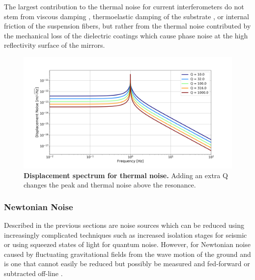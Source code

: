 		The largest contribution to the thermal noise for current interferometers do not stem from viscous damping \cite{SaulsonThermalNoise}, thermoelastic damping of the substrate \cite{Saulson}, or internal friction of the suspension fibers, but rather from the thermal noise contributed by the mechanical loss of the dielectric coatings \cite{HarryThermalCoat} \cite{EvansBallmerThermalOptic} which cause phase noise at the high reflectivity surface of the mirrors.
		
		\begin{figure}[ht]
			\centering
			\includegraphics[width=.9 \textwidth]{../Figures/ThermalNoise_ASD.png}
			\caption[Displacement spectrum for thermal noise.]  
			{\textbf{Displacement spectrum for thermal noise.} Adding an extra Q changes the peak and thermal noise above the resonance.}
			\label{fig:ThermalNoise}
		\end{figure}
		
		\subsubsection{Newtonian Noise}
		Described in the previous sections are noise sources which can be reduced using increasingly complicated techniques such as increased isolation stages for seismic or using squeezed states of light for quantum noise.  However, for Newtonian noise caused by fluctuating gravitational fields from the wave motion of the ground \cite{SaulsonNewtonian} and \cite{ThorneNewtonian} is one that cannot easily be reduced but possibly be measured and fed-forward or subtracted off-line \cite{DriggersNewtonian}.

